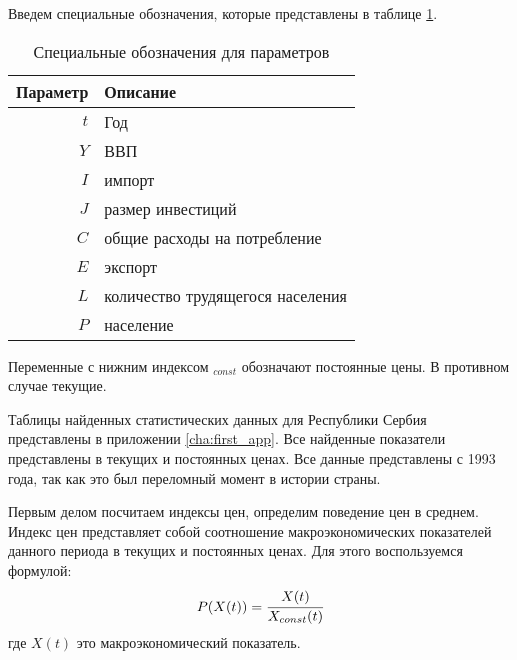 Введем специальные обозначения, которые представлены в таблице \ref{tab:desig_of_params}.
\begin{table}[ht]
	\centering
	\caption{Специальные обозначения для параметров}
	\begin{tabular}{|r|l|}
	\hline
	\multicolumn{1}{|r|}{Параметр} & \multicolumn{1}{l|}{Описание} \\ \hline
	$t$                          & Год                                                   \\
	$Y$                          & ВВП                                                   \\
	$I$                          & импорт                                                \\
	$J$                          & размер инвестиций                                     \\
	$C$                          & общие расходы на потребление                          \\
	$E$                          & экспорт                                               \\
	$L$                          & количество трудящегося населения\footnotemark         \\
	$P$                          & население                                             \\\hline
	\end{tabular}
	\label{tab:desig_of_params}
\end{table}
Переменные с нижним индексом $_{const}$ обозначают постоянные цены.
В противном случае текущие.

Таблицы найденных статистических данных для Республики Сербия представлены в приложении \ref{cha:first_app}.
Все найденные показатели представлены в текущих и постоянных ценах.
Все данные представлены с 1993 года, так как это был переломный момент в истории страны.

Первым делом посчитаем индексы цен, определим поведение цен в среднем.
Индекс цен представляет собой соотношение макроэкономических показателей данного периода в текущих и постоянных ценах.
Для этого воспользуемся формулой:
\begin{equation*}
	P(X(t)) = \cfrac{X(t)}{X_{const}(t)}
\end{equation*}
где $X(t)$ это макроэкономический показатель.

